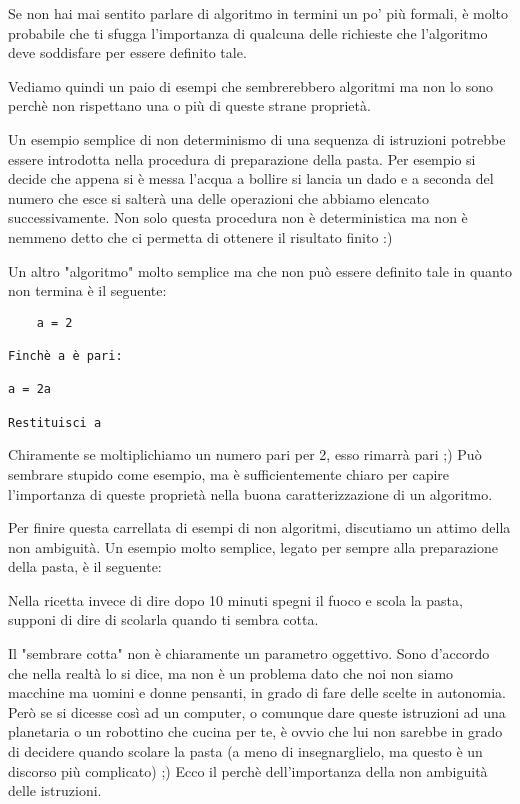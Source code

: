 Se non hai mai sentito parlare di algoritmo in termini un po' più formali, è molto probabile che ti sfugga l'importanza di qualcuna delle richieste che l'algoritmo deve soddisfare per essere definito tale.

Vediamo quindi un paio di esempi che sembrerebbero algoritmi ma non lo sono perchè non rispettano una o più di queste strane proprietà.

Un esempio semplice di non determinismo di una sequenza di istruzioni potrebbe essere introdotta nella procedura di preparazione della pasta. Per esempio si decide che appena si è messa l'acqua a bollire si lancia un dado e a seconda del numero che esce si salterà una delle operazioni che abbiamo elencato successivamente. Non solo questa procedura non è deterministica ma non è nemmeno detto che ci permetta di ottenere il risultato finito :)

Un altro "algoritmo" molto semplice ma che non può essere definito tale in quanto non termina è il seguente:

\begin{verbatim}
	a = 2

Finchè a è pari:

a = 2a

Restituisci a
\end{verbatim}
Chiramente se moltiplichiamo un numero pari per 2, esso rimarrà pari ;) Può sembrare stupido come esempio, ma è sufficientemente chiaro per capire l'importanza di queste proprietà nella buona caratterizzazione di un algoritmo.

Per finire questa carrellata di esempi di non algoritmi, discutiamo un attimo della non ambiguità. Un esempio molto semplice, legato per sempre alla preparazione della pasta, è il seguente:

Nella ricetta invece di dire dopo 10 minuti spegni il fuoco e scola la pasta, supponi di dire di scolarla quando ti sembra cotta.

Il "sembrare cotta" non è chiaramente un parametro oggettivo. Sono d'accordo che nella realtà lo si dice, ma non è un problema dato che noi non siamo macchine ma uomini e donne pensanti, in grado di fare delle scelte in autonomia. Però se si dicesse così ad un computer, o comunque dare queste istruzioni ad una planetaria o un robottino che cucina per te, è ovvio che lui non sarebbe in grado di decidere quando scolare la pasta (a meno di insegnarglielo, ma questo è un discorso più complicato) ;) Ecco il perchè dell'importanza della non ambiguità delle istruzioni.

